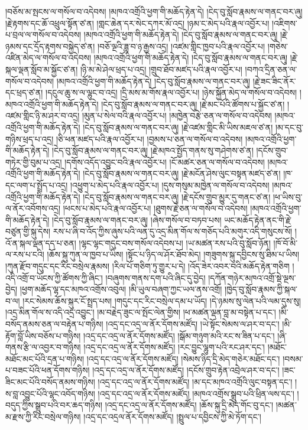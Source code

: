 \documentclass{article}
\begin{document}
།བཅོས་མ་སྤངས་ལ་གསོལ་བ་འདེབས། །མཁའ་འགྲོའི་ཕྱག་གི་མཆོད་རྟེན་དེ། །ངེད་བུ་སློབ་རྣམས་ལ་གནང་བར་ཞུ། །རྗེ་རྟགས་དང་ཆོ་འཕྲུལ་སྟོན་ཙ་ན། །གླང་ཆེན་དར་སེང་དཀར་མོ་འདྲ། །ཉམ་ང་མེད་པའི་རྣལ་འབྱོར་པ། །འཇིགས་པ་བྲལ་ལ་གསོལ་བ་འདེབས། །མཁའ་འགྲོའི་ཕྱག་གི་མཆོད་རྟེན་དེ། །ངེད་བུ་སློབ་རྣམས་ལ་གནང་བར་ཞུ། །རྗེ་ཉམས་དང་དྲོད་རྟགས་བསྐྱེད་ཙ་ན། །བཅོ་ལྔའི་ཟླ་བ་ཉ་རྒྱས་འདྲ། །འཛམ་གླིང་ཁྱབ་པའི་རྣལ་འབྱོར་པ། །གཅེས་འཛིན་མེད་ལ་གསོལ་བ་འདེབས། །མཁའ་འགྲོའི་ཕྱག་གི་མཆོད་རྟེན་དེ། །ངེད་བུ་སློབ་རྣམས་ལ་གནང་བར་ཞུ། །རྗེ་སྐལ་ལྡན་སློབ་མ་སྐྱོང་ཙ་ན། །ཉི་མ་མེ་ཤེལ་ཕྲད་པ་འདྲ། །གྲུབ་ཐོབ་མཛད་པའི་རྣལ་འབྱོར་པ། །བཀའ་དྲིན་ཅན་ལ་གསོལ་བ་འདེབས། །མཁའ་འགྲོའི་ཕྱག་གི་མཆོད་རྟེན་དེ། །ངེད་བུ་སློབ་རྣམས་ལ་གནང་བར་ཞུ། །རྗེ་ཟང་ཟིང་ནོར་དང་ཕྲད་ཙ་ན། །དངུལ་ཆུ་ས་ལ་ལྷུང་བ་འདྲ། །དྲི་མས་མ་གོས་རྣལ་འབྱོར་པ། །ཉེས་སྐྱོན་མེད་ལ་གསོལ་བ་འདེབས། །མཁའ་འགྲོའི་ཕྱག་གི་མཆོད་རྟེན་དེ། །ངེད་བུ་སློབ་རྣམས་ལ་གནང་བར་ཞུ། །རྗེ་མང་པོའི་ཚོགས་པ་སྐྱོང་ཙ་ན། །འཛམ་གླིང་ཉི་མ་ཤར་བ་འདྲ། །མུན་པ་སེལ་བའི་རྣལ་འབྱོར་པ། །མཁྱེན་བརྩེ་ཅན་ལ་གསོལ་བ་འདེབས། །མཁའ་འགྲོའི་ཕྱག་གི་མཆོད་རྟེན་དེ། །ངེད་བུ་སློབ་རྣམས་ལ་གནང་བར་ཞུ། །རྗེ་འཛམ་གླིང་མི་ཡིས་མཇལ་ཙ་ན། །མ་དང་བུ་གཉིས་ཕྲད་པ་འདྲ། །ཅི་ཕན་མཛད་པའི་རྣལ་འབྱོར་པ། །བྱམས་པ་ཅན་ལ་གསོལ་བ་འདེབས། །མཁའ་འགྲོའི་ཕྱག་གི་མཆོད་རྟེན་དེ། །ངེད་བུ་སློབ་རྣམས་ལ་གནང་བར་ཞུ། །རྗེ་མཁའ་སྤྱོད་གནས་སུ་གཤེགས་ཙ་ན། །དངོས་གྲུབ་གཏེར་གྱི་བུམ་པ་འདྲ། །དགོས་འདོད་འབྱུང་བའི་རྣལ་འབྱོར་པ། །ངོ་མཚར་ཅན་ལ་གསོལ་བ་འདེབས། །མཁའ་འགྲོའི་ཕྱག་གི་མཆོད་རྟེན་དེ། །ངེད་བུ་སློབ་རྣམས་ལ་གནང་བར་ཞུ། །རྗེ་མངོན་ཤེས་ལུང་བསྟན་མཛད་ཙ་ན། །ཁ་དང་ལག་པ་སྤྲོད་པ་འདྲ། །འཕྱུག་པ་མེད་པའི་རྣལ་འབྱོར་པ། །དུས་གསུམ་མཁྱེན་ལ་གསོལ་བ་འདེབས། །མཁའ་འགྲོའི་ཕྱག་གི་མཆོད་རྟེན་དེ། །ངེད་བུ་སློབ་རྣམས་ལ་གནང་བར་ཞུ། །རྗེ་དངོས་གྲུབ་མྱུར་དུ་གནང་ཙ་ན། །ཕ་ཡིས་བུ་ལ་ནོར་འབོགས་འདྲ། །ཕངས་པ་མེད་པའི་རྣལ་འབྱོར་པ། །ཐུགས་རྗེ་ཅན་ལ་གསོལ་བ་འདེབས། །མཁའ་འགྲོའི་ཕྱག་གི་མཆོད་རྟེན་དེ། །ངེད་བུ་སློབ་རྣམས་ལ་གནང་བར་ཞུ། །ཞེས་གསོལ་བ་བཏབ་པས། ཡང་མཆོད་རྟེན་ནང་གི་རྗེ་བཙུན་གྱི་སྐུ་དེས། རས་པ་ཞི་བ་འོད་ཀྱིས་ཞུས་པའི་ལན་དུ་འདྲ་མིན་གོལ་ས་གཅོད་པའི་མགུར་འདི་གསུངས་སོ། །འོ་ན་སྐལ་ལྡན་དད་པ་ཅན། །ལྷང་ལྷང་གདུང་བས་གསོལ་འདེབས་པ། །ཡ་མཚན་རས་པའི་བུ་སློབ་ཉོན། །ཁོ་བོ་མི་ལ་རས་པ་ངའི། །ཆོས་སྐུ་ཀུན་ལ་ཁྱབ་པ་ཡིས། །སྟོང་པ་ཉིད་ལ་ཤོར་ཐོབ་མེད། །གཟུགས་སྐུ་དབྱིངས་སུ་ཐིམ་པ་ཡིས། །ཀུན་རྫོབ་གདུང་དང་རིང་བསྲེལ་རྣམས། །རིལ་པོ་གཅིག་ཏུ་གྱུར་པ་དེ། །འོད་ཟེར་འབར་བའི་མཆོད་རྟེན་གཅིག །འདི་འགྲོ་བ་ཡོངས་ཀྱི་ཚོགས་ཀྱི་ཞིང་། །བཞུགས་གནས་དག་པའི་ཞིང་དུ་བྱེད། །དཀོན་གཉེར་མཁའ་འགྲོ་སྡེ་ལྔས་བྱེད། །ཕྱག་མཆོད་ལྷ་དང་མཁའ་འགྲོས་འབུལ། །མི་ཡུལ་བཞག་ཀྱང་ཡལ་ནས་འགྲོ། །ཁྱེད་བུ་སློབ་རྣམས་ཀྱི་སྐལ་བ་ལ། །རང་སེམས་ཆོས་སྐུར་ངོ་སྤྲད་པས། །གདུང་དང་རིང་བསྲེལ་དམ་པ་ཡོད། །དེ་ཉམས་སུ་ལེན་པའི་ལམ་དུས་སུ། །འདྲ་མིན་གོལ་ས་འདི་འདྲ་འབྱུང་། །མ་བརྗེད་ཟུང་ལ་སྤོང་ལེན་གྱིས། །ཕ་མཚན་ལྡན་བླ་མ་བསྟེན་པ་དང་། །མི་བསོད་ནམས་ཅན་ལ་བརྟེན་པ་གཉིས། །འདྲ་དང་འདྲ་ལ་ནོར་དོགས་མཛོད། །ཡེ་སྟོང་སེམས་ལ་ཤར་བ་དང་། །མི་རྟོག་བློ་ཡིས་བཅོས་པ་གཉིས། །འདྲ་དང་འདྲ་ལ་ནོར་དོགས་མཛོད། །སྒོམ་གཉུག་མའི་རང་ས་ཟིན་པ་དང་། །ཞི་གནས་རྩི་ལ་འབྱར་བ་གཉིས། །འདྲ་དང་འདྲ་ལ་ནོར་དོགས་མཛོད། །རང་བྱུང་ལྷུག་པའི་རང་ཤར་དང་། །མཐོང་མཐོང་མང་པོའི་དྲན་པ་གཉིས། །འདྲ་དང་འདྲ་ལ་ནོར་དོགས་མཛོད། །སེམས་ཉིད་དྲི་མེད་གཅེར་མཐོང་དང་། །བསམ་པ་བཟང་པོའི་ཕན་དོགས་གཉིས། །འདྲ་དང་འདྲ་ལ་ནོར་དོགས་མཛོད། །དངོས་གྲུབ་རྟེན་འབྲེལ་ཤར་བ་དང་། །ཟང་ཟིང་མང་པོའི་བསོད་ནམས་གཉིས། །འདྲ་དང་འདྲ་ལ་ནོར་དོགས་མཛོད། །མ་དང་མཁའ་འགྲོའི་ལུང་བསྟན་དང་། །ས་བླ་འབྱུང་པོའི་ལྷང་འབོད་གཉིས། །འདྲ་དང་འདྲ་ལ་ནོར་དོགས་མཛོད། །མཁའ་འགྲོས་སྒྲུབ་པའི་ཕྲིན་ལས་དང་། །བདུད་ཀྱིས་སྒྲུབ་པའི་བར་ཆད་གཉིས། །འདྲ་དང་འདྲ་ལ་ནོར་དོགས་མཛོད། །ཆོས་སྐུ་དྲི་མེད་གོང་བུ་དང་། །མཚན་མ་རྫས་ཀྱི་རིང་བསྲེལ་གཉིས། །འདྲ་དང་འདྲལ་ནོར་དོགས་མཛོད། །སྤྲུལ་པ་དབྱིངས་ཀྱི་མེ་ཏོག་དང་། 
\end{document}

